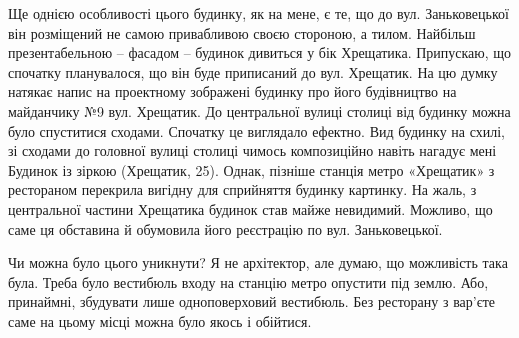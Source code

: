 Ще однією особливості цього будинку, як на мене, є те, що до вул. Заньковецької
він розміщений не самою привабливою своєю стороною, а тилом. Найбільш
презентабельною – фасадом – будинок дивиться у бік Хрещатика. Припускаю, що
спочатку планувалося, що він буде приписаний до вул. Хрещатик. На цю думку
натякає напис на проектному зображені будинку про його будівництво на
майданчику №9 вул. Хрещатик. До центральної вулиці столиці від будинку можна
було спуститися сходами. Спочатку це виглядало ефектно. Вид  будинку на схилі,
зі сходами до головної вулиці столиці чимось композиційно навіть нагадує мені
Будинок із зіркою (Хрещатик, 25). Однак, пізніше станція метро «Хрещатик» з
рестораном перекрила вигідну для сприйняття будинку картинку. На жаль, з
центральної частини Хрещатика будинок став майже невидимий. Можливо, що саме ця
обставина й обумовила його реєстрацію по вул. Заньковецької.

Чи можна було цього уникнути? Я не архітектор, але думаю, що можливість така
була. Треба було вестибюль входу на станцію метро опустити під землю. Або,
принаймні, збудувати лише одноповерховий вестибюль. Без ресторану з вар'єте
саме на цьому місці можна було якось і обійтися.

